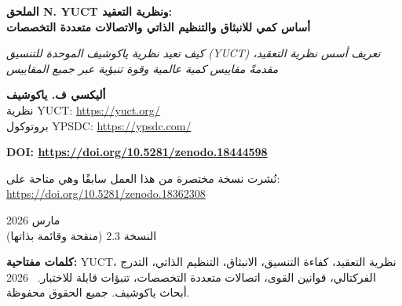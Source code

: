 \documentclass[11pt,a4paper]{article}
\theoremstyle{remark}
\newcommand{\Keff}{K_{\mathrm{eff}}}
\begin{document}
	
	\begin{titlepage} 
		\centering
		\vspace*{0cm}
		{\Huge\textbf{الملحق N. YUCT ونظرية التعقيد: \\ أساس كمي للانبثاق والتنظيم الذاتي والاتصالات متعددة التخصصات}\par}
		\vspace{1.2cm}
		{\small\textit{كيف تعيد نظرية ياكوشيف الموحدة للتنسيق (YUCT) تعريف أسس نظرية التعقيد، مقدمةً مقاييس كمية عالمية وقوة تنبؤية عبر جميع المقاييس}\par}
		\vspace{1.2cm}
		{\small\textbf{أليكسي ف. ياكوشيف} \\}
		نظرية YUCT: \url{https://yuct.org/}\\
		بروتوكول YPSDC: \url{https://ypsdc.com/}\par
		\vspace{2cm}
		\textbf{DOI: \url{https://doi.org/10.5281/zenodo.18444598}}\par
		\vspace{1cm}
		نُشرت نسخة مختصرة من هذا العمل سابقًا وهي متاحة على: \\ \url{https://doi.org/10.5281/zenodo.18362308}\par
		\vspace{1cm}
		مارس 2026 \\ النسخة 2.3 (منقحة وقائمة بذاتها)\par
		\newpage
		\begin{abstract}
			\noindent
			يقدم هذا الملحق عرضًا منهجيًا لكيفية تحويل نظرية ياكوشيف الموحدة للتنسيق (YUCT) لنظرية التعقيد من مجموعة من المفاهيم النوعية (الانبثاق، التنظيم الذاتي، قوانين القوى) إلى علم كمي تنبؤي. العناصر الرئيسية: (1) كفاءة التنسيق \(\Keff\) كمقياس عالمي لتنظيم النظام، مع تعريف إجرائي موحد؛ (2) قانون تدرج الخطأ الأساسي \(\varepsilon = \kappa_c \alpha \Keff^{-\beta}\) بأس \(\beta = 0.67\) (مُشتق في الملحق L وملخص هنا)، مفسرًا أصل قوانين القوى عبر المجالات؛ (3) بروتوكول YPSDC، كاشفًا آلية التنظيم الذاتي من خلال فصل القواميس والفهارس؛ (4) الهندسة ذات 19 بعدًا مع 120 قطاعًا و7140 اقترانًا \(\kappa_{sr}\) (الملحق A)، موفرةً بنية رياضية للنمذجة متعددة التخصصات؛ (5) ملخص قائم بذاته للتحقق التجريبي عبر أكثر من 50 رتبة أسية، من طاقات الروابط الذرية إلى تذبذبات الخلفية الكونية الميكروية؛ (6) تنبؤات محددة قابلة للاختبار في الكيمياء والبيولوجيا والاقتصاد ودراسات الوعي. يُظهر الملحق أن انبثاق الخصائص الجديدة يتوافق مع بلوغ قيم \(\Keff\) حرجة، يمكن التنبؤ بها نظريًا. يقدم لغة موحدة لوصف التعقيد في الأنظمة الفيزيائية والبيولوجية والاجتماعية والمعرفية، ويضع الأساس لتخصص علمي جديد: \textbf{علم النظاميات التنسيقية}.
		\end{abstract}
		\vspace{0.5cm}
		\noindent
		{\small\textbf{كلمات مفتاحية:}} YUCT، نظرية التعقيد، كفاءة التنسيق، الانبثاق، التنظيم الذاتي، التدرج الفركتالي، قوانين القوى، اتصالات متعددة التخصصات، تنبؤات قابلة للاختبار.
		\vspace{0.2cm}
		\noindent
		\textcopyright\ 2026 أبحاث ياكوشيف. جميع الحقوق محفوظة.
	\end{titlepage}
	
\end{document}
